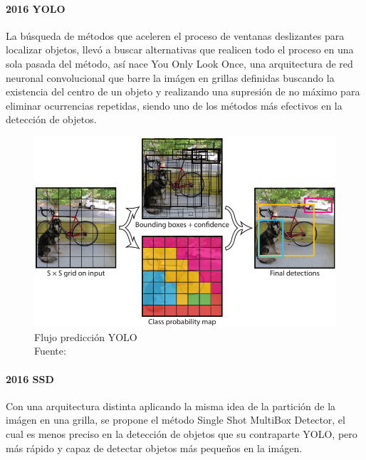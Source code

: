 \paragraph{2016 YOLO}
La búsqueda de métodos que aceleren el proceso de ventanas deslizantes para localizar objetos, llevó a buscar alternativas que realicen todo el proceso en una sola pasada del método, así nace You Only Look Once, una arquitectura de red neuronal convolucional que barre la imágen en grillas definidas buscando la existencia del centro de un objeto y realizando una supresión de no máximo para eliminar ocurrencias repetidas, siendo uno de los métodos más efectivos en la detección de objetos. \citep{Redmon2016YouOL}
\begin{figure}[H]
    \centering
    \includegraphics[scale=0.4]{imagenes/yolo}
    \caption[Flujo predicción YOLO]{Flujo predicción YOLO\\Fuente: \citep{Redmon2016YouOL}}
\end{figure}
\paragraph{2016 SSD}
Con una arquitectura distinta aplicando la misma idea de la partición de la imágen en una grilla, se propone el método Single Shot MultiBox Detector, el cual es menos preciso en la detección de objetos que su contraparte YOLO, pero más rápido y capaz de detectar objetos más pequeños en la imágen. \citep{liu-ssd}

